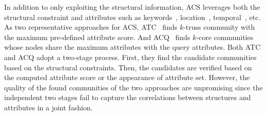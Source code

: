 In addition to only exploiting the structural information, ACS leverages both the structural constraint and attributes such as keywords~\cite{ACQ, ATC}, location~\cite{DBLP:conf/icde/WangCLZQ18}, temporal~\cite{DBLP:conf/icde/LiSQYD18}, etc. 
As two representative approaches for ACS, ATC~\cite{ATC} finds $k$-truss community with the maximum pre-defined attribute score. 
And ACQ~\cite{ACQ} finds $k$-core communities whose nodes share the maximum attributes with the query attributes.
Both ATC and ACQ adopt a two-stage process. First, they find the candidate communities based on the structural constraints.
Then, the candidates are verified based on the computed attribute score or the appearance of attribute set.
However, the quality of the found communities of the two approaches are unpromising since the independent two stages fail to capture the correlations between structures and attributes in a joint fashion. 

